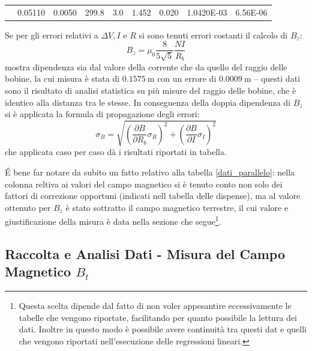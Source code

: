 \documentclass[a4paper,11pt]{article}
\begin{document}
\begin{table}[htpb]
\begin{tabular}{lrrrrrrrr}
				\rowcolor[HTML]{C0C0C0} 
				\multicolumn{1}{l|}{\cellcolor[HTML]{BBDAFF}13} & \multicolumn{1}{r|}{\cellcolor[HTML]{C0C0C0}0.05110}              & \multicolumn{1}{r|}{\cellcolor[HTML]{C0C0C0}0.0050} & \multicolumn{1}{r|}{\cellcolor[HTML]{C0C0C0}299.8}                        & \multicolumn{1}{r|}{\cellcolor[HTML]{C0C0C0}3.0}       & \multicolumn{1}{r|}{\cellcolor[HTML]{C0C0C0}1.452}               & \multicolumn{1}{r|}{\cellcolor[HTML]{C0C0C0}0.020}     & \multicolumn{1}{r|}{\cellcolor[HTML]{C0C0C0}1.0420E-03}                  & \multicolumn{1}{r|}{\cellcolor[HTML]{C0C0C0}6.56E-06}  \\ \cline{2-9} 
			\end{tabular}
		\end{table}
		Se per gli errori relativi a $\Delta V, I$ e $R$ si sono tenuti errori costanti il calcolo di $B_z$:
		\[
		B_z = \mu_0 \frac{8}{5\sqrt{5}} \frac{NI}{R_b}
		\] 
		mostra dipendenza sia dal valore della corrente che da quello del raggio delle bobine, la cui misura è stata di $\SI{0.1575}{\meter}$ con un errore di $\SI{0.0009}{\meter}$ -- questi dati sono il risultato di analisi statistica su più misure del raggio delle bobine, che è identico alla distanza tra le stesse. In conseguenza della doppia dipendenza di $B_z$ si è applicata la formula di propagazione degli errori:
		\[
		\sigma_B = \sqrt{\left(\frac{\partial B}{\partial R_b} \sigma_R \right)^2 + \left(\frac{\partial B}{\partial I} \sigma_I \right)^2}
		\] 
		che applicata caso per caso dà i risultati riportati in tabella.
		
		\'E bene far notare da subito un fatto relativo alla tabella \ref{dati_parallelo}: nella colonna reltiva ai valori del campo magnetico si è tenuto conto non solo dei fattori di correzione opportuni (indicati nell tabella delle dispense), ma al valore ottenuto per $B_z$ è stato sottratto il campo magnetico terrestre, il cui valore e giustificazione della misura è data nella sezione che segue\footnote{Questa scelta dipende dal fatto di non voler appesantire eccessivamente le tabelle che vengono riportate, facilitando per quanto possibile la lettura dei dati. Inoltre in questo modo è possibile avere continuità tra questi dat e quelli che vengono riportati nell'esecuzione delle regressioni lineari.}.
		
		\subsection{Raccolta e Analisi Dati - Misura del Campo Magnetico $B_t$}
		
\end{document}
